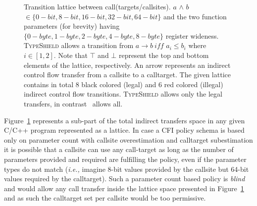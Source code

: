 \begin{figure}[h!]
{

}
\caption{Transition lattice between call(targets/callsites).
$a$ $\wedge$ $b$ $\in \{0-bit, 8-bit, 16-bit, 32-bit, 64-bit\}$ and the two 
function parameters (for brevity) having $\{0-byte, 1-byte, 2-byte, 4-byte, 8-byte\}$ register wideness. 
\textsc{TypeShield} allows a transition from $a \rightarrow b \ iff$ $a_{i} \le b_{i}$ where $i \in [1, 2]$.
Note that $\top$ and $\bot$ represent the top and bottom elements of the lattice, respectively.
An arrow represents an indirect control flow transfer from a callsite to a calltarget. 
The given lattice contains in total 8 black colored (legal) and 6 red colored (illegal) indirect control flow transitions. 
\textsc{TypeShield} allows only the legal transfers, in contrast~\cite{veen:typearmor} allows all.}
\label{fig:lattice3264}
\end{figure}

Figure~\ref{fig:lattice3264} represents
a sub-part of the total indirect transfers space in any given C/C++ program represented as a lattice. 
In case a CFI policy schema is based only on parameter count with callsite overestimation and calltarget subestimation 
it is possible that a callsite can use any call-target as long as the number of 
parameters provided and required are fulfilling the policy, even if the parameter types do not match 
(\textit{i.e.,} imagine 8-bit values provided by the callsite but 64-bit values required by the calltarget). 
Such a parameter count based policy is \textit{blind} and would allow any call transfer 
inside the lattice space presented in Figure~\ref{fig:lattice3264} and as such the calltarget set per 
callsite would be too permissive.

